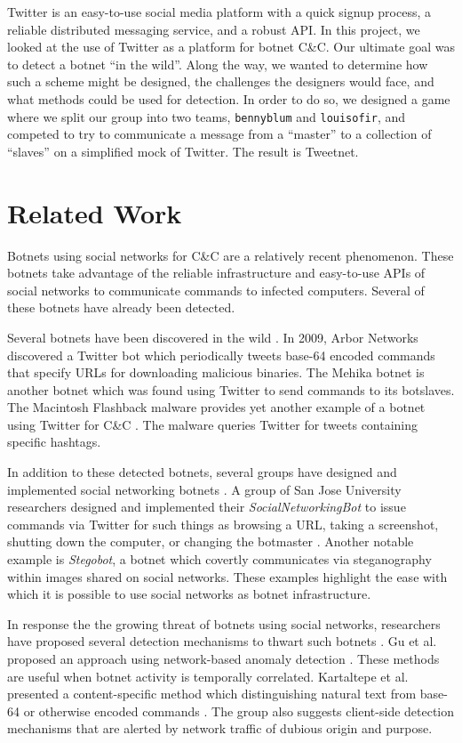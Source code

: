 \documentclass[11pt, oneside]{article} %
\numberwithin{equation}{section} %
\numberwithin{figure}{section} %
\numberwithin{table}{section} %
\renewcommand{\c}[1]{\texttt{#1}}
\newcommand{\teambb}{\c{bennyblum}}
\newcommand{\teamol}{\c{louisofir}}
\begin{document}
Twitter is an easy-to-use social media platform with a quick signup process, a reliable distributed messaging service, and a robust API. In this project, we looked at the use of Twitter as a platform for botnet C\&C. Our ultimate goal was to detect a botnet ``in the wild''. Along the way, we wanted to determine how such a scheme might be designed, the challenges the designers would face, and what methods could be used for detection. In order to do so, we designed a game where we split our group into two teams, \teambb{} and \teamol{}, and competed to try to communicate a message from a ``master'' to a collection of ``slaves'' on a simplified mock of Twitter. The result is Tweetnet.

\section {Related Work}
Botnets using social networks for C\&C are a relatively recent phenomenon. These botnets take advantage of the reliable infrastructure and easy-to-use APIs of social networks to communicate commands to infected computers. Several of these botnets have already been detected.

Several botnets have been discovered in the wild \cite{arbor, trendmicro, flashback}. In 2009, Arbor Networks \cite{arbor} discovered a Twitter bot which periodically tweets base-64 encoded commands that specify URLs for downloading malicious binaries. The Mehika botnet \cite{trendmicro} is another botnet which was found using Twitter to send commands to its botslaves. The Macintosh Flashback malware provides yet another example of a botnet using Twitter for C\&C \cite{flashback}. The malware queries Twitter for tweets containing specific hashtags.

In addition to these detected botnets, several groups have designed and implemented social networking botnets \cite{socialnetworking, trojan7, stegobot}. A group of San Jose University researchers designed and implemented their \emph{SocialNetworkingBot} to issue commands via Twitter for such things as browsing a URL, taking a screenshot, shutting down the computer, or changing the botmaster \cite{socialnetworking}. Another notable example is \emph{Stegobot}, a botnet which covertly communicates via steganography within images shared on social networks. These examples highlight the ease with which it is possible to use social networks as botnet infrastructure.

In response the the growing threat of botnets using social networks, researchers have proposed several detection mechanisms to thwart such botnets \cite{botsniffer, kartaltepe, burghouwt}. Gu et al. proposed an approach using network-based anomaly detection \cite{botsniffer}. These methods are useful when botnet activity is temporally correlated. Kartaltepe et al. presented a content-specific method which distinguishing natural text from base-64 or otherwise encoded commands \cite{kartaltepe}. The group also suggests client-side detection mechanisms that are alerted by network traffic of dubious origin and purpose.
\end{document}
